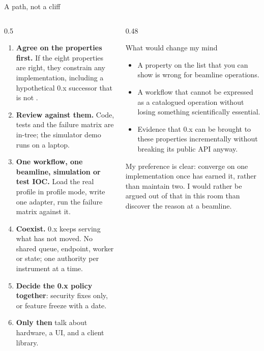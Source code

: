 \begin{frame}{A path, not a cliff}
    \begin{columns}[T]
        \begin{column}{0.5\textwidth}
            \small
            \begin{enumerate}
                \item \textbf{Agree on the properties first.} If the eight properties are right, they constrain
                      any implementation, including a hypothetical 0.x successor that is not \vtwo{}.
                \item \textbf{Review \vtwo{} against them.} Code, tests and the failure matrix are in-tree;
                      the simulator demo runs on a laptop.
                \item \textbf{One workflow, one beamline, simulation or test IOC.} Load the real profile in
                      profile mode, write one adapter, run the failure matrix against it.
                \item \textbf{Coexist.} 0.x keeps serving what has not moved. No shared queue, endpoint,
                      worker or state; one authority per instrument at a time.
                \item \textbf{Decide the 0.x policy together}: security fixes only, or feature freeze with a date.
                \item \textbf{Only then} talk about hardware, a UI, and a client library.
            \end{enumerate}
        \end{column}
        \begin{column}{0.48\textwidth}
            \begin{block}{What would change my mind}
                \small
                \begin{itemize}
                    \item A property on the list that you can show is wrong for beamline operations.
                    \item A workflow that cannot be expressed as a catalogued operation without losing
                          something scientifically essential.
                    \item Evidence that 0.x can be brought to these properties incrementally without breaking
                          its public API anyway.
                \end{itemize}
            \end{block}
            \vspace{0.2cm}
            {\small\color{qsgray} My preference is clear: converge on one implementation once \vtwo{} has
            earned it, rather than maintain two. I would rather be argued out of that in this room than
            discover the reason at a beamline.\par}
        \end{column}
    \end{columns}
\end{frame}


